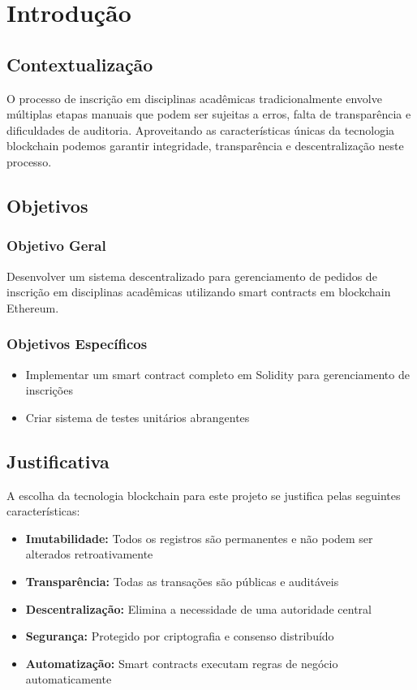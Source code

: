 \documentclass[12pt,a4paper]{article}
\begin{document}
\section{Introdução}

\subsection{Contextualização}

O processo de inscrição em disciplinas acadêmicas tradicionalmente envolve múltiplas etapas manuais que podem ser sujeitas a erros, falta de transparência e dificuldades de auditoria. Aproveitando as características únicas da tecnologia blockchain podemos garantir integridade, transparência e descentralização neste processo.

\subsection{Objetivos}

\subsubsection{Objetivo Geral}
Desenvolver um sistema descentralizado para gerenciamento de pedidos de inscrição em disciplinas acadêmicas utilizando smart contracts em blockchain Ethereum.

\subsubsection{Objetivos Específicos}
\begin{itemize}
    \item Implementar um smart contract completo em Solidity para gerenciamento de inscrições
    \item Criar sistema de testes unitários abrangentes
\end{itemize}

\subsection{Justificativa}

A escolha da tecnologia blockchain para este projeto se justifica pelas seguintes características:

\begin{itemize}
    \item \textbf{Imutabilidade:} Todos os registros são permanentes e não podem ser alterados retroativamente
    \item \textbf{Transparência:} Todas as transações são públicas e auditáveis
    \item \textbf{Descentralização:} Elimina a necessidade de uma autoridade central
    \item \textbf{Segurança:} Protegido por criptografia e consenso distribuído
    \item \textbf{Automatização:} Smart contracts executam regras de negócio automaticamente
\end{itemize}
\end{document}
